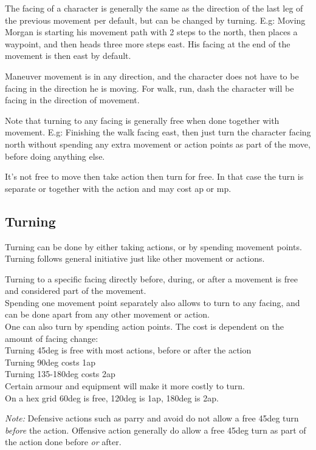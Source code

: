 The facing of a character is generally the same as the direction of the last leg of the previous movement per default, but can be changed by turning. E.g: Moving Morgan is starting his movement path with 2 steps to the north, then places a waypoint, and then heads three more steps east. His facing at the end of the movement is then east by default.

Maneuver movement is in any direction, and the character does not have to be facing in the direction he is moving. For walk, run, dash the character will be facing in the direction of movement.

Note that turning to any facing is generally free when done together with movement. E.g: Finishing the walk facing east, then just turn the character facing north without spending any extra movement or action points as part of the move, before doing anything else.

It's not free to move then take action then turn for free. In that case the turn is separate or together with the action and may cost ap or mp.


\subsection*{Turning}
Turning can be done by either taking actions, or by spending movement points. Turning follows general initiative just like other movement or actions.

Turning to a specific facing directly before, during, or after a movement is free and considered part of the movement. \\
Spending one movement point separately also allows to turn to any facing, and can be done apart from any other movement or action. \\
One can also turn by spending action points. The cost is dependent on the amount of facing change: \\
Turning 45deg is free with most actions, before or after the action \\
Turning 90deg costs 1ap \\
Turning 135-180deg costs 2ap \\
Certain armour and equipment will make it more costly to turn.\\
On a hex grid 60deg is free, 120deg is 1ap, 180deg is 2ap.

\emph{Note:} Defensive actions such as parry and avoid do not allow a free 45deg turn \emph{before} the action. Offensive action generally do allow a free 45deg turn as part of the action done before \emph{or} after.


